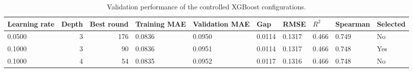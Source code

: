 \begin{table}
\caption{Validation performance of the controlled XGBoost configurations.}
\label{tab:xgboost-configuration-comparison}
\begin{tabular}{lrrlllllll}
\toprule
Learning rate & Depth & Best round & Training MAE & Validation MAE & Gap & RMSE & $R^2$ & Spearman & Selected \\
\midrule
0.0500 & 3 & 176 & 0.0836 & 0.0950 & 0.0114 & 0.1317 & 0.466 & 0.749 & No \\
0.1000 & 3 & 90 & 0.0836 & 0.0951 & 0.0114 & 0.1317 & 0.466 & 0.748 & Yes \\
0.1000 & 4 & 54 & 0.0835 & 0.0952 & 0.0117 & 0.1316 & 0.466 & 0.748 & No \\
\bottomrule
\end{tabular}
\end{table}
